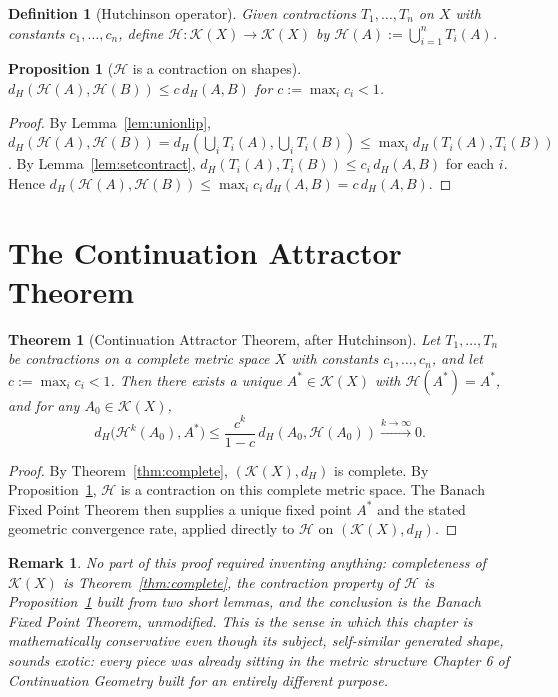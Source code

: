 \documentclass[11pt]{report}
\newtheorem{proposition}{Proposition}[chapter]
\newtheorem{theorem}{Theorem}[chapter]
\newtheorem{definition}{Definition}[chapter]
\newtheorem{remark}{Remark}[chapter]
\begin{document}
\begin{definition}[Hutchinson operator]
Given contractions $T_1, \dots, T_n$ on $X$ with constants
$c_1, \dots, c_n$, define $\mathcal{H} : \mathcal{K}(X) \to \mathcal{K}(X)$
by $\mathcal{H}(A) := \bigcup_{i=1}^n T_i(A)$.
\end{definition}

\begin{proposition}[$\mathcal{H}$ is a contraction on shapes]
\label{prop:hcontract}
$d_H(\mathcal{H}(A), \mathcal{H}(B)) \leq c\, d_H(A,B)$ for
$c := \max_i c_i < 1$.
\end{proposition}
\begin{proof}
By Lemma~\ref{lem:unionlip},
$d_H(\mathcal{H}(A), \mathcal{H}(B)) = d_H\left(\bigcup_i T_i(A), \bigcup_i T_i(B)\right)
\leq \max_i d_H(T_i(A), T_i(B))$. By Lemma~\ref{lem:setcontract},
$d_H(T_i(A), T_i(B)) \leq c_i\, d_H(A,B)$ for each $i$. Hence
$d_H(\mathcal{H}(A), \mathcal{H}(B)) \leq \max_i c_i\, d_H(A,B) = c\, d_H(A,B)$.
\end{proof}

\section*{The Continuation Attractor Theorem}

\begin{theorem}[Continuation Attractor Theorem, after Hutchinson]
\label{thm:attractor}
Let $T_1, \dots, T_n$ be contractions on a complete metric space $X$
with constants $c_1, \dots, c_n$, and let $c := \max_i c_i < 1$. Then
there exists a unique $A^\ast \in \mathcal{K}(X)$ with
$\mathcal{H}(A^\ast) = A^\ast$, and for any $A_0 \in \mathcal{K}(X)$,
\[
d_H\big(\mathcal{H}^k(A_0), A^\ast\big) \leq \frac{c^k}{1-c}\, d_H(A_0, \mathcal{H}(A_0)) \xrightarrow{k \to \infty} 0.
\]
\end{theorem}
\begin{proof}
By Theorem~\ref{thm:complete}, $(\mathcal{K}(X), d_H)$ is complete. By
Proposition~\ref{prop:hcontract}, $\mathcal{H}$ is a contraction on
this complete metric space. The Banach Fixed Point Theorem then
supplies a unique fixed point $A^\ast$ and the stated geometric
convergence rate, applied directly to $\mathcal{H}$ on
$(\mathcal{K}(X), d_H)$.
\end{proof}

\begin{remark}
No part of this proof required inventing anything: completeness of
$\mathcal{K}(X)$ is Theorem~\ref{thm:complete}, the contraction
property of $\mathcal{H}$ is Proposition~\ref{prop:hcontract} built
from two short lemmas, and the conclusion is the Banach Fixed Point
Theorem, unmodified. This is the sense in which this chapter is
mathematically conservative even though its subject, self-similar
generated shape, sounds exotic: every piece was already sitting in
the metric structure Chapter 6 of \emph{Continuation Geometry}
built for an entirely different purpose.
\end{remark}
\end{document}
